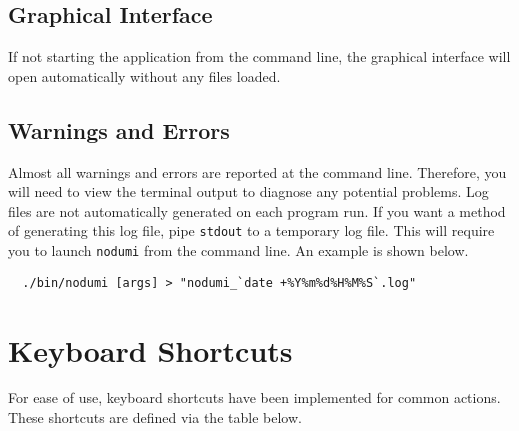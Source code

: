 \documentclass[english]{article}
\providecommand{\mi}[1]{\texttt{#1}}
\begin{document}
\subsection{Graphical Interface}

If not starting the application from the command line, the graphical interface will open automatically without any files loaded.

\subsection{Warnings and Errors}

Almost all warnings and errors are reported at the command line. Therefore, you will need to view the terminal output to
diagnose any potential problems. Log files are not automatically generated on each program run. If you want a method of
generating this log file, pipe \mi{stdout} to a temporary log file. This will require you to launch \mi{nodumi} from the command
line. An example is shown below.

\begin{verbatim}
  ./bin/nodumi [args] > "nodumi_`date +%Y%m%d%H%M%S`.log"
\end{verbatim}

\newpage
\section{Keyboard Shortcuts}

For ease of use, keyboard shortcuts have been implemented for common actions. These shortcuts are defined via the table below.

\vspace{1em}
\end{document}
